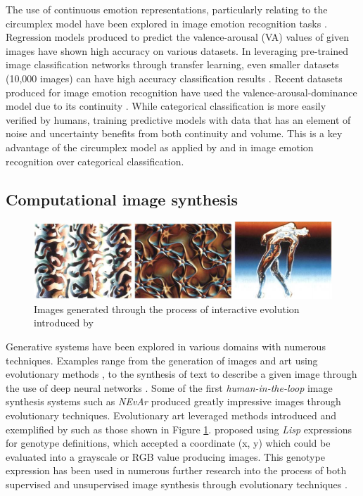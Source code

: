 \documentclass{article}
\begin{document}
The use of continuous emotion representations, particularly relating to the circumplex model have been explored in image emotion recognition tasks \citep{kim2018building, zhao2016predicting, zhao2017continuous}.
Regression models produced to predict the valence-arousal (VA) values of given images have shown high accuracy on various datasets.
In leveraging pre-trained image classification networks through transfer learning, even smaller datasets (10,000 images) can have high accuracy classification results \citep{kim2018building}.
Recent datasets produced for image emotion recognition have used the valence-arousal-dominance model due to its continuity \citep{zhao2016predicting}.
While categorical classification is more easily verified by humans, training predictive models with data that has an element of noise and uncertainty benefits from both continuity and volume.
This is a key advantage of the circumplex model as applied by \citet{kim2018building} and \citet{zhao2016predicting} in image emotion recognition over categorical classification.


\subsection{Computational image synthesis}

\begin{figure}[h!]
	\includegraphics[width=\textwidth]{images/sims-interactive-image-generation.png}
	\caption{Images generated through the process of interactive evolution introduced by \citet{sims}}
	\label{fig:sims}
\end{figure}

Generative systems have been explored in various domains with numerous techniques.
Examples range from the generation of images and art using evolutionary methods \citep{sims, nevar}, to the synthesis of text to describe a given image through the use of deep neural networks \citep{mathews2016senticap}.
Some of the first \textit{human-in-the-loop} image synthesis systems such as \textit{NEvAr} \citep{nevar} produced greatly impressive images through evolutionary techniques.
Evolutionary art leveraged methods introduced and exemplified by \citet{sims} such as those shown in Figure \ref{fig:sims}.
\citet{sims} proposed using \textit{Lisp} expressions for genotype definitions, which accepted a coordinate (x, y) which could be evaluated into a grayscale or RGB value producing images.
This genotype expression has been used in numerous further research into the process of both supervised and unsupervised image synthesis through evolutionary techniques \citep{nevar, sims, den2011evolving, distributed-evolutionary-art, aesthetic-measures}.
\end{document}
